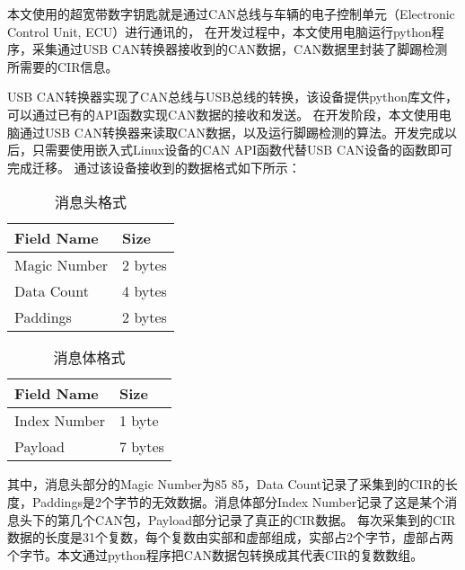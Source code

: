 本文使用的超宽带数字钥匙就是通过CAN总线与车辆的电子控制单元（Electronic Control Unit, ECU）进行通讯的，
在开发过程中，本文使用电脑运行python程序，采集通过USB CAN转换器接收到的CAN数据，CAN数据里封装了脚踢检测所需要的CIR信息。

USB CAN转换器实现了CAN总线与USB总线的转换，该设备提供python库文件，可以通过已有的API函数实现CAN数据的接收和发送。
在开发阶段，本文使用电脑通过USB CAN转换器来读取CAN数据，以及运行脚踢检测的算法。开发完成以后，只需要使用嵌入式Linux设备的CAN API函数代替USB CAN设备的函数即可完成迁移。
通过该设备接收到的数据格式如下所示：

\noindent
\begin{minipage}{.5\textwidth}
    \begin{table}[H]
        \caption{\label{tab:Header}消息头格式}
        \centering
        \begin{tabular}{|l|l|}
        \hline
        Field Name & Size \\
        \hline
        Magic Number & 2 bytes \\
        \hline
        Data Count & 4 bytes \\
        \hline
        Paddings & 2 bytes \\
        \hline
        \end{tabular}
    \end{table}
\end{minipage}%
\begin{minipage}{.5\textwidth}
    \begin{table}[H]
        \caption{\label{tab:Payload}消息体格式}
        \centering
        \begin{tabular}{|l|l|}
        \hline
        Field Name & Size \\
        \hline
        Index Number & 1 byte \\
        \hline
        Payload & 7 bytes \\
        \hline
        \end{tabular}
    \end{table}
\end{minipage}
\vspace{\baselineskip} %

其中，消息头部分的Magic Number为85 85，Data Count记录了采集到的CIR的长度，Paddings是2个字节的无效数据。消息体部分Index Number记录了这是某个消息头下的第几个CAN包，Payload部分记录了真正的CIR数据。
每次采集到的CIR数据的长度是31个复数，每个复数由实部和虚部组成，实部占2个字节，虚部占两个字节。本文通过python程序把CAN数据包转换成其代表CIR的复数数组。


